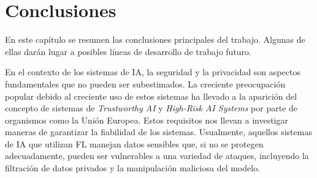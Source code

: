 \chapter{Conclusiones}\label{sec:conclusiones}

En este capítulo se resumen las conclusiones principales del trabajo. Algunas de ellas darán lugar a posibles líneas de desarrollo de trabajo futuro.

En el contexto de los sistemas de \ac{IA}, la seguridad y la privacidad son aspectos fundamentales que no pueden ser subestimados. La creciente preocupación popular debido al creciente uso de estos sistemas ha llevado a la aparición del concepto de sistemas de \textit{Trustworthy AI} y  \textit{High-Risk AI Systems} por parte de organismos como la Unión Europea. Estos requisitos nos llevan a investigar maneras de garantizar la fiabilidad de los sistemas. Usualmente, aquellos sistemas de \ac{IA} que utilizan \ac{FL} manejan datos sensibles que, si no se protegen adecuadamente, pueden ser vulnerables a una variedad de ataques, incluyendo la filtración de datos privados y la manipulación maliciosa del modelo.

